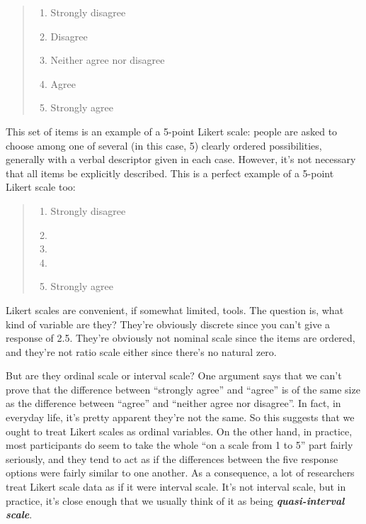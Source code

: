 \documentclass[
]{book}
\providecommand{\tightlist}{%
  \setlength{\itemsep}{0pt}\setlength{\parskip}{0pt}}
\theoremstyle{definition}
\theoremstyle{definition}
\theoremstyle{definition}
\theoremstyle{definition}
\theoremstyle{remark}
\begin{document}
\begin{quote}
\begin{enumerate}
\def\labelenumi{(\arabic{enumi})}
\tightlist
\item
  Strongly disagree
\item
  Disagree
\item
  Neither agree nor disagree
\item
  Agree
\item
  Strongly agree
\end{enumerate}
\end{quote}

This set of items is an example of a 5-point Likert scale: people are asked to choose among one of several (in this case, 5) clearly ordered possibilities, generally with a verbal descriptor given in each case. However, it's not necessary that all items be explicitly described. This is a perfect example of a 5-point Likert scale too:

\begin{quote}
\begin{enumerate}
\def\labelenumi{(\arabic{enumi})}
\tightlist
\item
  Strongly disagree
\item
\item
\item
\item
  Strongly agree
\end{enumerate}
\end{quote}

Likert scales are convenient, if somewhat limited, tools. The question is, what kind of variable are they? They're obviously discrete since you can't give a response of 2.5. They're obviously not nominal scale since the items are ordered, and they're not ratio scale either since there's no natural zero.

But are they ordinal scale or interval scale? One argument says that we can't prove that the difference between ``strongly agree'' and ``agree'' is of the same size as the difference between ``agree'' and ``neither agree nor disagree''. In fact, in everyday life, it's pretty apparent they're not the same. So this suggests that we ought to treat Likert scales as ordinal variables. On the other hand, in practice, most participants do seem to take the whole ``on a scale from 1 to 5'' part fairly seriously, and they tend to act as if the differences between the five response options were fairly similar to one another. As a consequence, a lot of researchers treat Likert scale data as if it were interval scale. It's not interval scale, but in practice, it's close enough that we usually think of it as being \textbf{\emph{quasi-interval scale}}.
\end{document}
